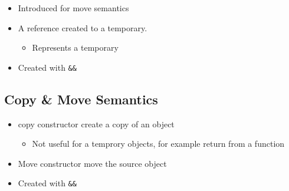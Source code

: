 \begin{itemize}
    \item Introduced for move semantics
    \item A reference created to a temporary.
    \begin{itemize}
      \item Represents a temporary
    \end{itemize}
    \item Created with \texttt{\&\&}
\end{itemize}

\subsection{ Copy \& Move Semantics} 
\begin{itemize}
    \item copy constructor create a copy of an object
      \begin{itemize}
        \item Not useful for a temprory objects, for example return from a function
      \end{itemize}
    \item Move constructor move the source object
    \item Created with \texttt{\&\&}
\end{itemize}
